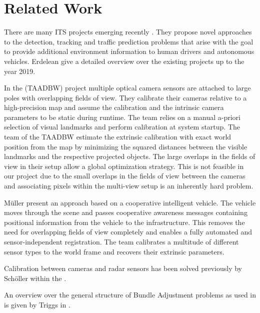 \section{Related Work}
There are many ITS projects emerging recently  \cite{koster2017testfeld,arnold2020cooperative,arnoldCooperativePerception,agrawal2008censure}. 
They propose novel approaches to the detection, tracking and traffic prediction problems that arise with the goal to provide additional environment information to human drivers and autonomous vehicles.
Erdelean \etal{} \cite{erdelean2019catalogue} give a detailed overview over the existing projects up to the year 2019.

In the \TAADBW{} (TAADBW) project multiple optical camera sensors are attached to large poles with overlapping fields of view.
They calibrate their cameras relative to a high-precision map and assume the calibration and the intrinsic camera parameters to be static during runtime. 
The team relies on a manual a-priori selection of visual landmarks and perform calibration at system startup.  
The team of the TAADBW estimate the extrinsic calibration with exact world position from the map by minimizing the squared distances between the visible landmarks and the respective projected objects.
The large overlaps in the fields of view in their setup allow a global optimization strategy. 
This is not feasible in our project due to the small overlaps in the fields of view between the cameras \cite{kraemmer2020providentia} and associating pixels within the multi-view setup is an inherently hard problem. 

Müller \etal{} \cite{laciMueller} present an approach based on a cooperative intelligent vehicle.
The vehicle moves through the scene and passes cooperative awareness messages containing positional information from the vehicle to the infrastructure. 
This removes the need for overlapping fields of view completely and enables a fully automated and sensor-independent registration.
The team calibrates a multitude of different sensor types to the world frame and recovers their extrinsic parameters. 

Calibration between cameras and radar sensors has been solved previously by Schöller \etal{} within the \Providentia{}.

An overview over the general structure of Bundle Adjustment problems as used in  is given by Triggs \etal{} in \cite{triggs10.1007/3-540-44480-7_21}.
